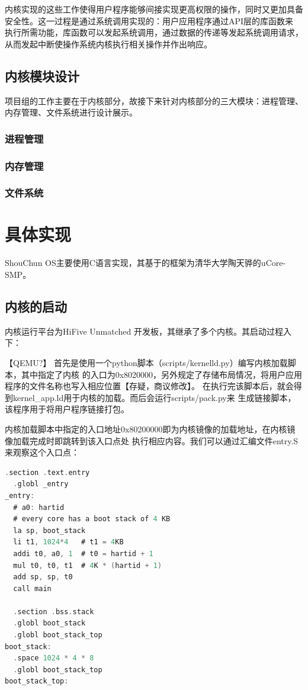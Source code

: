 \documentclass[UTF8,a4paper,10pt]{ctexart}
\begin{document}
内核实现的这些工作使得用户程序能够间接实现更高权限的操作，同时又更加具备安全性。这一过程是通过系统调用实现的：用户应用程序通过API层的库函数来
执行所需功能，库函数可以发起系统调用，通过数据的传递等发起系统调用请求，从而发起中断使操作系统内核执行相关操作并作出响应。



\subsection{内核模块设计}
项目组的工作主要在于内核部分，故接下来针对内核部分的三大模块：进程管理、内存管理、文件系统进行设计展示。
\subsubsection{进程管理}


\subsubsection{内存管理}
\subsubsection{文件系统}


\section{具体实现}

ShouChun OS主要使用C语言实现，其基于的框架为清华大学陶天骅的uCore-SMP。

\subsection{内核的启动}

内核运行平台为HiFive Unmatched 开发板，其继承了多个内核。其启动过程入下：

【QEMU?】
首先是使用一个python脚本（scripts/kernelld.py）编写内核加载脚本，其中指定了内核
的入口为0x8020000，另外规定了存储布局情况，将用户应用程序的文件名称也写入相应位置【存疑，商议修改】。
在执行完该脚本后，就会得到kernel\_app.ld用于内核的加载。而后会运行scripts/pack.py来
生成链接脚本，该程序用于将用户程序链接打包。

内核加载脚本中指定的入口地址0x80200000即为内核镜像的加载地址，在内核镜像加载完成时即跳转到该入口点处
执行相应内容。我们可以通过汇编文件entry.S来观察这个入口点：

\begin{lstlisting}[title=内核镜像入口,frame=trbl,language={C}]
  .section .text.entry
  .globl _entry
_entry:
  # a0: hartid
  # every core has a boot stack of 4 KB
  la sp, boot_stack
  li t1, 1024*4   # t1 = 4KB
  addi t0, a0, 1  # t0 = hartid + 1
  mul t0, t0, t1  # 4K * (hartid + 1)
  add sp, sp, t0  
  call main

  .section .bss.stack
  .globl boot_stack
  .globl boot_stack_top
boot_stack:
  .space 1024 * 4 * 8
  .globl boot_stack_top
boot_stack_top:
\end{lstlisting}
\end{document}
